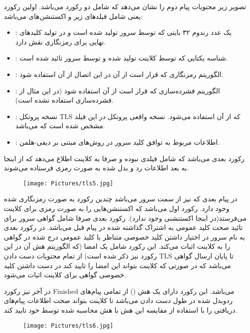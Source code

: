 \documentclass{report}
\begin{document}
تصویر زیر محتویات پیام دوم را نشان می‌دهد که شامل دو رکورد می‌باشد. اولین رکورد یعنی  شامل فیلدهای زیر و اکستنشن‌های می‌باشد:
\begin{itemize}
	\item {}:
	یک عدد رندوم ۳۲ بایتی که توسط سرور تولید شده است و در تولید کلیدهای نهایی برای رمزنگاری نقش دارد.
	
	\item {}:
	شناسه یکتایی که توسط کلاینت تولید شده و توسط سرور تائید شده است.
	
	\item {}:
	الگوریتم رمزنگاری که قرار است از آن در این اتصال از آن استفاده شود.
	
	\item {}:
	الگوریتم فشرده‌سازی که قرار است از آن استفاده شود (در این مثال از فشرده‌سازی استفاده نشده است).
	
	\item {}:
	نسخه پروتکل TLS که از آن استفاده می‌شود. نسخه واقعی پروتکل در این فیلد مشخص شده است که  می‌باشد.
	
	\item {}:
	اطلاعات مربوط به توافق کلید سرور در روش‌های مبتنی بر دیفی-هلمن.
	
\end{itemize}

رکورد بعدی  می‌باشد که شامل فیلدی نبوده و صرفا به کلاینت اطلاع می‌دهد که از اینجا به بعد اطلاعات رد و بدل شده به صورت رمزی فرستاده می‌شوند.
\begin{figure}[H]
	\centering
	\texttt{[image: Pictures/tls5.jpg]}
	\label{tls5}
\end{figure}

در پیام بعدی که نیز از سمت سرور می‌باشد چندین رکورد به صورت رمزنگاری شده وجود دارد. رکورد اول  می‌باشد که اکستنشن‌هایی را به صورت رمزی برای کلاینت می‌فرستد(در اینجا اکستنشنی وجود ندارد). رکورد بعدی صرفا شامل گواهی سرور برای تائید صحت کلید عمومی به اشتراک گذاشته شده در  پیام قبل می‌باشد. در رکورد بعدی به نام  سرور در اختیار داشتن کلید خصوصی متناظر با کلید عمومی درج شده در گواهی را به کلاینت اثبات می‌کند. این رکورد شامل یک امضا (که الگوریتم هش آن در این رکورد نیز ذکر شده است) از تمام محتویات دست دادن TLS تا پایان ارسال گواهی می‌باشد که در صورتی که کلاینت بتواند این امضا را تایید کند در دست داشتن کلید خصوصی گواهی برای کلاینت اثبات می‌شود.

در آخر نیز رکورد Finished می‌باشد. این رکورد دارای یک هش () از تمامی پیام‌های ردوبدل شده در طول دست دادن می‌باشد تا کلاینت بتواند صحت اطلاعات پیام‌های دریافتی را با استفاده از مقایسه این هش با هش محاسبه شده توسط خود تایید کند.
\begin{figure}[H]
	\centering
	\texttt{[image: Pictures/tls6.jpg]}
	\label{tls6}
\end{figure}
\end{document}
